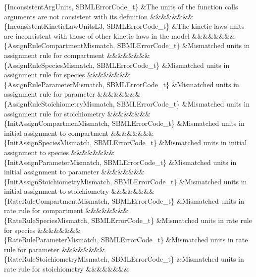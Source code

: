 \begin{DoxyParagraph}{}
\begin{longtabu}
\{Inconsistent\+Arg\+Units, S\+B\+M\+L\+Error\+Code\+\_\+t\} &The units of the function call\textquotesingle{}s arguments are not consistent with its definition &&&&&&&&\\
\{Inconsistent\+Kinetic\+Law\+Units\+L3, S\+B\+M\+L\+Error\+Code\+\_\+t\} &The kinetic law\textquotesingle{}s units are inconsistent with those of other kinetic laws in the model &&&&&&&&\\
\{Assign\+Rule\+Compartment\+Mismatch, S\+B\+M\+L\+Error\+Code\+\_\+t\} &Mismatched units in assignment rule for compartment &&&&&&&&\\
\{Assign\+Rule\+Species\+Mismatch, S\+B\+M\+L\+Error\+Code\+\_\+t\} &Mismatched units in assignment rule for species &&&&&&&&\\
\{Assign\+Rule\+Parameter\+Mismatch, S\+B\+M\+L\+Error\+Code\+\_\+t\} &Mismatched units in assignment rule for parameter &&&&&&&&\\
\{Assign\+Rule\+Stoichiometry\+Mismatch, S\+B\+M\+L\+Error\+Code\+\_\+t\} &Mismatched units in assignment rule for stoichiometry &&&&&&&&\\
\{Init\+Assign\+Compartmen\+Mismatch, S\+B\+M\+L\+Error\+Code\+\_\+t\} &Mismatched units in initial assignment to compartment &&&&&&&&\\
\{Init\+Assign\+Species\+Mismatch, S\+B\+M\+L\+Error\+Code\+\_\+t\} &Mismatched units in initial assignment to species &&&&&&&&\\
\{Init\+Assign\+Parameter\+Mismatch, S\+B\+M\+L\+Error\+Code\+\_\+t\} &Mismatched units in initial assignment to parameter &&&&&&&&\\
\{Init\+Assign\+Stoichiometry\+Mismatch, S\+B\+M\+L\+Error\+Code\+\_\+t\} &Mismatched units in initial assignment to stoichiometry &&&&&&&&\\
\{Rate\+Rule\+Compartment\+Mismatch, S\+B\+M\+L\+Error\+Code\+\_\+t\} &Mismatched units in rate rule for compartment &&&&&&&&\\
\{Rate\+Rule\+Species\+Mismatch, S\+B\+M\+L\+Error\+Code\+\_\+t\} &Mismatched units in rate rule for species &&&&&&&&\\
\{Rate\+Rule\+Parameter\+Mismatch, S\+B\+M\+L\+Error\+Code\+\_\+t\} &Mismatched units in rate rule for parameter &&&&&&&&\\
\{Rate\+Rule\+Stoichiometry\+Mismatch, S\+B\+M\+L\+Error\+Code\+\_\+t\} &Mismatched units in rate rule for stoichiometry &&&&&&&&\\

\end{longtabu}
\end{DoxyParagraph}

